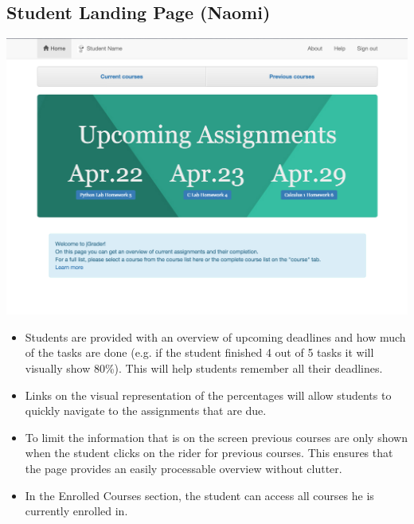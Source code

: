\subsection{Student Landing Page (Naomi)}

\includegraphics[width=\textwidth]{screenshots/StudentUpcomingAssignments.png}

\begin{itemize}

\item Students are provided with an overview of upcoming deadlines and how much of the tasks are done (e.g. if the student finished 4 out of 5 tasks it will visually show 80\%). This will help students remember all their deadlines.

\item Links on the visual representation of the percentages will allow students to quickly navigate to the assignments that are due.

\item To limit the information that is on the screen previous courses are only shown when the student clicks on the rider for previous courses. This ensures that the page provides an easily processable overview without clutter.

\item In the Enrolled Courses section, the student can access all courses he is currently enrolled in.

\end{itemize}
